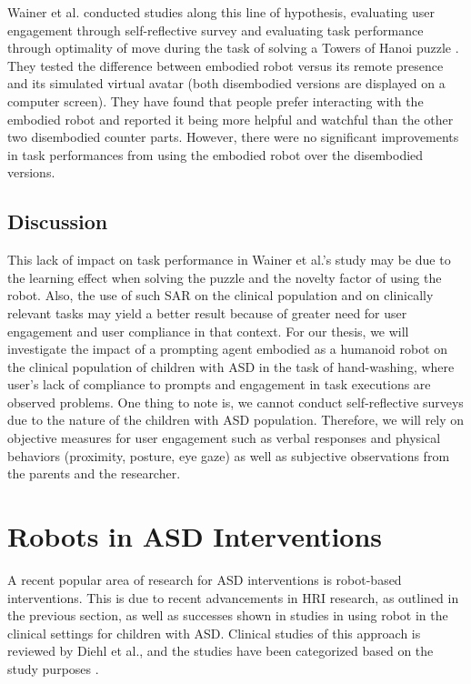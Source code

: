 \documentclass{ut-thesis}
\begin{document}
Wainer et al. conducted studies along this line of hypothesis, evaluating user engagement through self-reflective survey and evaluating task performance through optimality of move during the task of solving a Towers of Hanoi puzzle \cite{wainer2007embodiment}.  They tested the difference between embodied robot versus its remote presence and its simulated virtual avatar (both disembodied versions are displayed on a computer screen).  They have found that people prefer interacting with the embodied robot and reported it being more helpful and watchful than the other two disembodied counter parts.  However, there were no significant improvements in task performances from using the embodied robot over the disembodied versions.


\subsection{Discussion}
This lack of impact on task performance in Wainer et al.'s study may be due to the learning effect when solving the puzzle and the novelty factor of using the robot.  Also, the use of such SAR on the clinical population and on clinically relevant tasks may yield a better result because of greater need for user engagement and user compliance in that context.  For our thesis, we will investigate the impact of a prompting agent embodied as a humanoid robot on the clinical population of children with ASD in the task of hand-washing, where user's lack of compliance to prompts and engagement in task executions are observed problems.  One thing to note is, we cannot conduct self-reflective surveys due to the nature of the children with ASD population.  Therefore, we will rely on objective measures for user engagement such as verbal responses and physical behaviors (proximity, posture, eye gaze) \cite{mataric2005role} as well as subjective observations from the parents and the researcher.



\section{Robots in ASD Interventions}


A recent popular area of research for ASD interventions is robot-based interventions.  This is due to recent advancements in HRI research, as outlined in the previous section, as well as successes shown in studies in using robot in the clinical settings for children with ASD.  Clinical studies of this approach is reviewed by Diehl et al., and the studies have been categorized based on the study purposes \cite{diehl2012clinical}.
\end{document}
